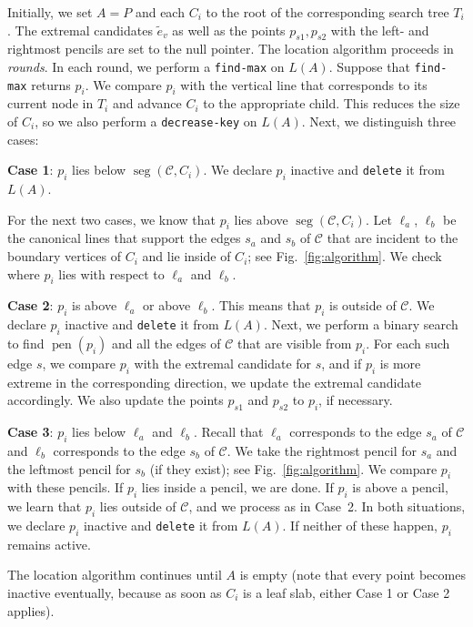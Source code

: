 \documentclass[letterpaper,11pt]{article}
\DeclareMathOperator{\seg}{seg}
\DeclareMathOperator{\pen}{pen}
\newcommand{\findmax}{\texttt{find-max}}
\newcommand{\delete}{\texttt{delete}}
\newcommand{\deckey}{\texttt{decrease-key}}
\newcommand{\cC}{\mathcal{C}}
\begin{document}
Initially, we set $A = P$ and each 
$C_i$ to the root of the corresponding search
tree $T_i$. The extremal candidates 
$\tilde{e}_v$ as well as the points 
$p_{s1}, p_{s2}$ with the left- and 
rightmost pencils are set to the 
null pointer. The location algorithm 
proceeds in \emph{rounds}. In each round, 
we perform a \findmax{} on $L(A)$. 
Suppose that \findmax{} returns $p_i$.
We compare $p_i$ with the vertical 
line that corresponds to its current node
in $T_i$ and advance $C_i$ to 
the appropriate child. This reduces the
size of $C_i$, so we also perform a 
\deckey{} on $L(A)$. Next, we distinguish 
three cases:

\noindent\textbf{Case 1}: $p_i$ lies below 
$\seg(\cC, C_i)$. We declare $p_i$ 
inactive and \delete{} it from $L(A)$.

For the next two cases, we know 
that $p_i$ lies above $\seg(\cC, C_i)$.
Let $\ell_a$, $\ell_b$ be the canonical 
lines that support the edges
$s_a$ and $s_b$ of $\cC$ that are 
incident to the boundary vertices of
$C_i$ and lie inside of $C_i$; see 
Fig.~\ref{fig:algorithm}.
We check where $p_i$ lies with respect 
to $\ell_a$ and $\ell_b$.

\noindent\textbf{Case 2}:  
$p_i$ is above $\ell_a$ or above $\ell_b$. 
This means that $p_i$ is outside of $\cC$.  
We declare $p_i$ inactive and
\delete{} it from $L(A)$. Next, we 
perform a binary search to find 
$\pen(p_i)$ and all the edges of 
$\cC$ that are visible 
from $p_i$. For each such edge $s$,
we compare $p_i$ with the extremal 
candidate for $s$, and if $p_i$ is more 
extreme in the corresponding direction, 
we update the extremal candidate accordingly. 
We also update the points $p_{s1}$ and 
$p_{s2}$ to $p_i$, if necessary. 

\noindent\textbf{Case 3}: $p_i$ lies 
below $\ell_a$ and $\ell_b$. Recall that
$\ell_a$ corresponds to the edge $s_a$ of 
$\cC$ and $\ell_b$ corresponds to the 
edge $s_b$ of $\cC$. We take the rightmost 
pencil for $s_a$ and the leftmost pencil for $s_b$ 
(if they exist); see Fig.~\ref{fig:algorithm}.
We compare $p_i$ with these pencils. 
If $p_i$ lies inside a pencil, we are done.
If $p_i$ is above a pencil, we learn 
that $p_i$ lies outside of $\cC$, and we 
process as in Case~2. In both situations, 
we declare $p_i$ inactive and \delete{} it 
from $L(A)$. 
If neither of these happen, $p_i$ remains active.

The location algorithm continues until $A$ is 
empty (note that every point becomes inactive 
eventually, because as soon as $C_i$ is a leaf
slab, either Case 1 or Case 2 applies).
\end{document}
